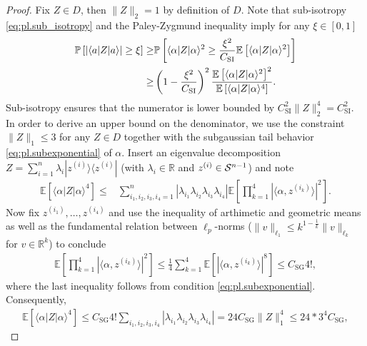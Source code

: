 \begin{proof}
Fix $ Z \in D$, then $\|  Z \|_2 =1$ by definition of $D$.
Note that sub-isotropy \eqref{eq:pl.sub_isotropy} and the Paley-Zygmund inequality imply for any $\xi \in [0,1]$
\begin{align}
  \mathbb{P} \left[ | \langle  a|  Z | a \rangle| \geq \xi \right]
  \geq & \mathbb{P} \left[ \langle  \alpha|  Z | \alpha \rangle^2 \geq \frac{\xi^2}{C_\mathrm{SI}} \mathbb{E} \left[ \langle  \alpha| Z| \alpha \rangle^2 \right] \right] \\
  \geq & \left(1-\frac{\xi^2}{C_\mathrm{SI}}\right)^2 \frac{\mathbb{E} \left[ \langle  \alpha | Z | \alpha \rangle^2 \right]^2}{\mathbb{E} \left[ \langle  \alpha|  Z | \alpha \rangle^4 \right]}.
\end{align}
Sub-isotropy ensures that the numerator is lower bounded by $C_\mathrm{SI}^2 \|  Z \|_2^4 = C_\mathrm{SI}^2$.
In order to derive an upper bound on the denominator, we use the constraint $\|  Z \|_1 \leq 3$ for any $ Z \in D$ together with the subgaussian tail behavior \eqref{eq:pl.subexponential} of $\alpha$.
Insert an eigenvalue decomposition $ Z = \sum_{i=1}^n \lambda_i | z^{(i)} \rangle \! \langle  z^{(i)}|$ (with $\lambda_i \in \mathbb{R}$ and $ z^{(i)} \in \mathcal{S}^{n-1}$) and note
\begin{align}
  \mathbb{E} \left[ \langle  \alpha|  Z | \alpha \rangle^4 \right]
  \leq & \sum_{i_1,i_2,i_3,i_4=1}^n | \lambda_{i_1} \lambda_{i_2} \lambda_{i_3} \lambda_{i_4} | \mathbb{E} \left[ \prod_{k=1}^4 | \langle  \alpha,  z^{(i_k)} \rangle|^2 \right]. \label{eq:pl.Q_aux1}
\end{align}
Now fix $ z^{(i_1)},\ldots, z^{(i_4)}$ and use the inequality of arthimetic and geometric means as well as the fundamental relation between $\ell_p$-norms ($\|  v \|_{\ell_1} \leq k^{1-\frac{1}{k}} \|  v \|_{\ell_k}$ for $v \in \mathbb{R}^k$) to conclude
\begin{align}
  \mathbb{E} \left[ \prod_{k=1}^4 | \langle  \alpha, z^{(i_k)}\rangle |^2 \right]
  \leq \frac{1}{4} \sum_{k=1}^4 \mathbb{E} \left[ | \langle  \alpha,  z^{(i_k)} \rangle|^8 \right]
  \leq C_\mathrm{SG} 4!,
\end{align}
where the last inequality follows from condition \eqref{eq:pl.subexponential}.
Consequently,
\begin{align}
  \mathbb{E} \left[ \langle  \alpha|  Z |  \alpha\rangle^4 \right]
  \leq C_\mathrm{SG} 4! \sum_{i_1,i_2,i_3,i_4} | \lambda_{i_1} \lambda_{i_2} \lambda_{i_3} \lambda_{i_4} |
  = 24 C_\mathrm{SG} \|  Z \|_1^4 \leq 24*3^4 C_\mathrm{SG},

\end{align}
\end{proof}

